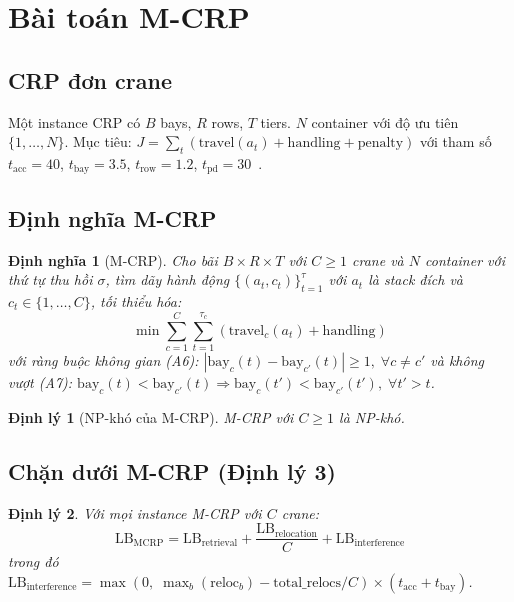 \documentclass[11pt,a4paper]{elsarticle}
\newtheorem{definition}{Định nghĩa}[section]
\newtheorem{theorem}{Định lý}[section]
\newcommand{\LB}{\text{LB}}
\begin{document}
\section{Bài toán M-CRP}

\subsection{CRP đơn crane}
Một instance CRP có $B$ bays, $R$ rows, $T$ tiers. $N$ container với độ ưu tiên $\{1,\dots,N\}$. Mục tiêu: $J = \sum_t (\text{travel}(a_t) + \text{handling} + \text{penalty})$ với tham số $t_{\text{acc}}=40$, $t_{\text{bay}}=3.5$, $t_{\text{row}}=1.2$, $t_{\text{pd}}=30$~\cite{shin2026}.

\subsection{Định nghĩa M-CRP}
\begin{definition}[M-CRP]
Cho bãi $B \times R \times T$ với $C \geq 1$ crane và $N$ container với thứ tự thu hồi $\sigma$, tìm dãy hành động $\{(a_t,c_t)\}_{t=1}^\tau$ với $a_t$ là stack đích và $c_t \in \{1,\dots,C\}$, tối thiểu hóa:
\begin{equation}
    \min \sum_{c=1}^C \sum_{t=1}^{\tau_c} (\text{travel}_c(a_t) + \text{handling})
\end{equation}
với ràng buộc không gian (A6): $|\text{bay}_c(t) - \text{bay}_{c'}(t)| \geq 1,\; \forall c \neq c'$ và không vượt (A7): $\text{bay}_c(t) < \text{bay}_{c'}(t) \Rightarrow \text{bay}_c(t') < \text{bay}_{c'}(t'),\; \forall t' > t$.
\end{definition}

\begin{theorem}[NP-khó của M-CRP]
M-CRP với $C \geq 1$ là NP-khó.
\end{theorem}

\subsection{Chặn dưới M-CRP (Định lý 3)}
\begin{theorem}
Với mọi instance M-CRP với $C$ crane:
\begin{equation}
    \LB_{\text{MCRP}} = \LB_{\text{retrieval}} + \frac{\LB_{\text{relocation}}}{C} + \LB_{\text{interference}}
\end{equation}
trong đó $\LB_{\text{interference}} = \max(0,\; \max_b(\text{reloc}_b) - \text{total\_relocs}/C) \times (t_{\text{acc}} + t_{\text{bay}})$.
\end{theorem}
\end{document}
